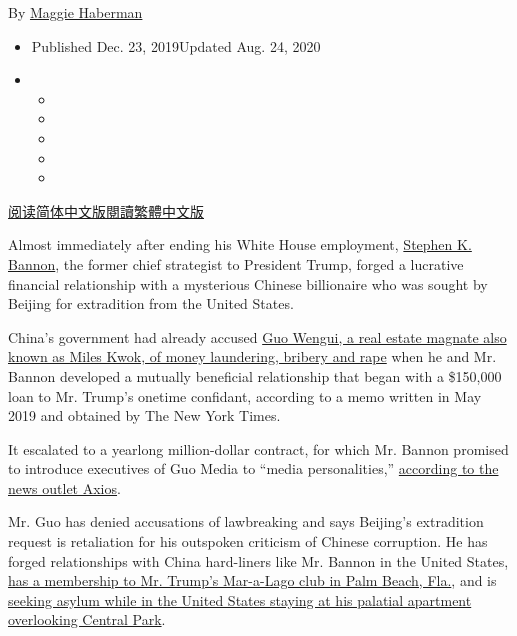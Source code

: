 By \href{https://www.nytimes3xbfgragh.onion/by/maggie-haberman}{Maggie
Haberman}

\begin{itemize}
\item
  Published Dec. 23, 2019Updated Aug. 24, 2020
\item
  \begin{itemize}
  \item
  \item
  \item
  \item
  \item
  \end{itemize}
\end{itemize}

\href{https://cn.nytimes3xbfgragh.onion/usa/20191224/steve-bannon-guo-wengui/}{阅读简体中文版}\href{https://cn.nytimes3xbfgragh.onion/usa/20191224/steve-bannon-guo-wengui/zh-hant/}{閱讀繁體中文版}

Almost immediately after ending his White House employment,
\href{https://www.nytimes3xbfgragh.onion/2020/08/31/nyregion/steve-bannon-build-the-wall-fraud.html}{Stephen
K. Bannon}, the former chief strategist to President Trump, forged a
lucrative financial relationship with a mysterious Chinese billionaire
who was sought by Beijing for extradition from the United States.

China's government had already accused
\href{https://www.nytimes3xbfgragh.onion/2018/01/10/magazine/the-mystery-of-the-exiled-billionaire-whistleblower.html}{Guo
Wengui, a real estate magnate also known as Miles Kwok, of money
laundering, bribery and rape} when he and Mr. Bannon developed a
mutually beneficial relationship that began with a \$150,000 loan to Mr.
Trump's onetime confidant, according to a memo written in May 2019 and
obtained by The New York Times.

It escalated to a yearlong million-dollar contract, for which Mr. Bannon
promised to introduce executives of Guo Media to ``media
personalities,''
\href{https://www.axios.com/steve-bannon-contract-chinese-billionaire-guo-media-fa6bc244-6d7a-4a53-9f03-1296d4fae5aa.html}{according
to the news outlet Axios}.

Mr. Guo has denied accusations of lawbreaking and says Beijing's
extradition request is retaliation for his outspoken criticism of
Chinese corruption. He has forged relationships with China hard-liners
like Mr. Bannon in the United States,
\href{https://www.wsj.com/articles/chinese-tycoon-holed-up-in-manhattan-hotel-is-accused-of-spying-for-beijing-11563810726}{has
a membership to Mr. Trump's Mar-a-Lago club in Palm Beach, Fla.}, and is
\href{https://www.nytimes3xbfgragh.onion/2017/09/07/world/asia/china-guo-wengui-corruption-asylum.html}{seeking
asylum while in the United States staying at his palatial apartment
overlooking Central Park}.

